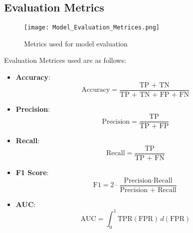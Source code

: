 \vspace{\baselineskip}

\subsection{Evaluation Metrics}

\begin{figure}[h!]
    \centering
    \texttt{[image: Model\_Evaluation\_Metrices.png]}
    \caption{Metrics used for model evaluation}
    \label{fig:model_evaluation_metrics}
\end{figure}

Evaluation Metrices used are as follows:
\begin{itemize}
    \item \textbf{Accuracy}: 
    \begin{equation}
        \text{Accuracy} = \frac{\text{TP + TN}}{\text{TP + TN + FP + FN}}
    \end{equation}
    \item \textbf{Precision}:
    \begin{equation}
        \text{Precision} = \frac{\text{TP}}{\text{TP + FP}}
    \end{equation}
    \item \textbf{Recall}:
    \begin{equation}
        \text{Recall} = \frac{\text{TP}}{\text{TP + FN}}
    \end{equation}
    \item \textbf{F1 Score}:
    \begin{equation}
        \text{F1} = 2 \cdot \frac{\text{Precision} \cdot \text{Recall}}{\text{Precision + Recall}}
    \end{equation}
    \item \textbf{AUC}:
    \begin{equation}
        \text{AUC} = \int_{0}^{1} \text{TPR}(\text{FPR}) \, d(\text{FPR})
    \end{equation}
\end{itemize}
\vspace{\baselineskip}